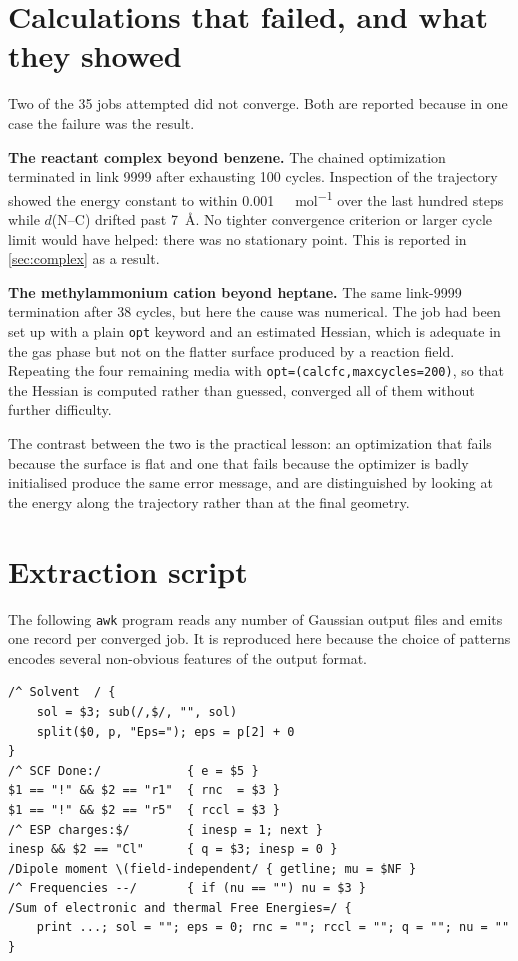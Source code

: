 \documentclass[10pt,a4paper]{article}
\begin{document}



\appendix
\section{Calculations that failed, and what they showed}
\label{app:failures}

Two of the 35 jobs attempted did not converge. Both are reported because in one case
the failure was the result.

\textbf{The reactant complex beyond benzene.} The chained optimization terminated in
link 9999 after exhausting 100 cycles. Inspection of the trajectory showed the
energy constant to within \SI{0.001}{\kilo\calorie\per\mole} over the last hundred
steps while $d$(N--C) drifted past \SI{7}{\angstrom}. No tighter convergence
criterion or larger cycle limit would have helped: there was no stationary point.
This is reported in \cref{sec:complex} as a result.

\textbf{The methylammonium cation beyond heptane.} The same link-9999 termination
after 38 cycles, but here the cause was numerical. The job had been set up with a
plain \texttt{opt} keyword and an estimated Hessian, which is adequate in the gas
phase but not on the flatter surface produced by a reaction field. Repeating the
four remaining media with \texttt{opt=(calcfc,maxcycles=200)}, so that the Hessian
is computed rather than guessed, converged all of them without further difficulty.

The contrast between the two is the practical lesson: an optimization that fails
because the surface is flat and one that fails because the optimizer is badly
initialised produce the same error message, and are distinguished by looking at the
energy along the trajectory rather than at the final geometry.

\section{Extraction script}
\label{app:script}

The following \texttt{awk} program reads any number of Gaussian output files and
emits one record per converged job. It is reproduced here because the choice of
patterns encodes several non-obvious features of the output format.

\begin{verbatim}
/^ Solvent  / {
    sol = $3; sub(/,$/, "", sol)
    split($0, p, "Eps="); eps = p[2] + 0
}
/^ SCF Done:/            { e = $5 }
$1 == "!" && $2 == "r1"  { rnc  = $3 }
$1 == "!" && $2 == "r5"  { rccl = $3 }
/^ ESP charges:$/        { inesp = 1; next }
inesp && $2 == "Cl"      { q = $3; inesp = 0 }
/Dipole moment \(field-independent/ { getline; mu = $NF }
/^ Frequencies --/       { if (nu == "") nu = $3 }
/Sum of electronic and thermal Free Energies=/ {
    print ...; sol = ""; eps = 0; rnc = ""; rccl = ""; q = ""; nu = ""
}
\end{verbatim}
\end{document}
